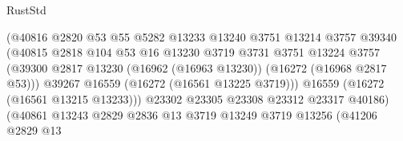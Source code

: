 \begin{lexlean}{RustStd}
\begin{coremodule}
                                          (@40816
                                            @2820
                                            @53
                                            @55
                                            @5282
                                            @13233
                                            @13240
                                            @3751
                                            @13214
                                            @3757
                                            @39340
                                            (@40815
                                              @2818
                                              @104
                                              @53
                                              @16
                                              @13230
                                              @3719
                                              @3731
                                              @3751
                                              @13224
                                              @3757
                                              (@39300
                                                @2817
                                                @13230
                                                (@16962 (@16963 @13230))
                                                (@16272 (@16968 @2817 @53)))
                                              @39267
                                              @16559
                                              (@16272 (@16561 @13225 @3719)))
                                            @16559
                                            (@16272 (@16561 @13215 @13233)))
                                          @23302
                                          @23305
                                          @23308
                                          @23312
                                          @23317
                                          @40186)
                                        (@40861
                                          @13243
                                          @2829
                                          @2836
                                          @13
                                          @3719
                                          @13249
                                          @3719
                                          @13256
                                          (@41206
                                            @2829
                                            @13

\end{coremodule}
\end{lexlean}
